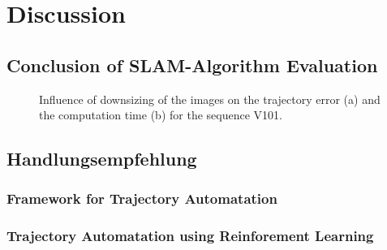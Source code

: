 \chapter{Discussion}

\section{Conclusion of SLAM-Algorithm Evaluation}


	\begin{figure}%
    \centering
	\qquad
    \caption{
	Influence of downsizing of the images on the trajectory error (a) and the computation time (b) for the sequence V101. 
	}%
    \label{fig:resolution}%
	\end{figure}

\section{Handlungsempfehlung}

\subsection{Framework for Trajectory Automatation}

\subsection{Trajectory Automatation using Reinforement Learning}

